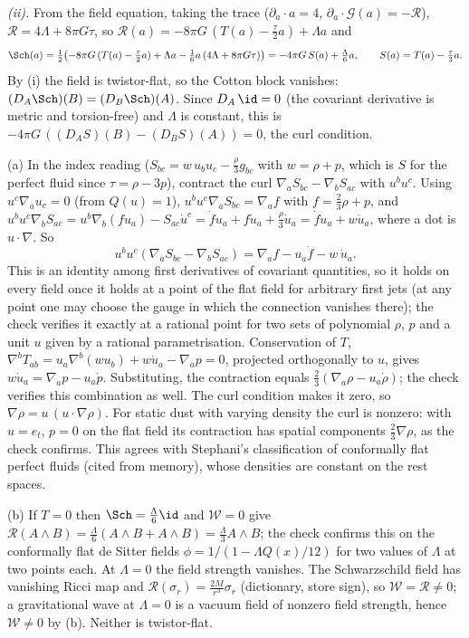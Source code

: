 \emph{(ii).} From the field equation, taking the trace ($\partial_{a} \cdot a = 4$, $\partial_{a} \cdot \mathcal{G}(a) = -\mathcal{R}$), $\mathcal{R} = 4\Lambda + 8\pi G\tau$, so $\mathcal{R}(a) = -8\pi G\,(T(a) - \tfrac{\tau}{2}a) + \Lambda a$ and
\[
\Sch(a) = \tfrac12\bigl(-8\pi G\,(T(a) - \tfrac{\tau}{2}a) + \Lambda a - \tfrac16 a\,(4\Lambda + 8\pi G\tau)\bigr) = -4\pi G\,S(a) + \tfrac{\Lambda}{6}a, \qquad S(a) = T(a) - \tfrac{\tau}{3}a .
\]
By (i) the field is twistor-flat, so the Cotton block vanishes: $(D_{A}\Sch)(B) = (D_{B}\Sch)(A)$. Since $D_{A}\,\id = 0$ (the covariant derivative is metric and torsion-free) and $\Lambda$ is constant, this is $-4\pi G\,((D_{A}S)(B) - (D_{B}S)(A)) = 0$, the curl condition.

(a) In the index reading ($S_{bc} = w\,u_{b}u_{c} - \tfrac{\rho}{3}g_{bc}$ with $w = \rho + p$, which is $S$ for the perfect fluid since $\tau = \rho - 3p$), contract the curl $\nabla_{a}S_{bc} - \nabla_{b}S_{ac}$ with $u^{b}u^{c}$. Using $u^{c}\nabla_{a}u_{c} = 0$ (from $Q(u) = 1$), $u^{b}u^{c}\nabla_{a}S_{bc} = \nabla_{a}f$ with $f = \tfrac23\rho + p$, and $u^{b}u^{c}\nabla_{b}S_{ac} = u^{b}\nabla_{b}(f u_{a}) - S_{ac}\dot u^{c} = \dot f u_{a} + f\dot u_{a} + \tfrac{\rho}{3}\dot u_{a} = \dot f u_{a} + w\dot u_{a}$, where a dot is $u \cdot \nabla$. So
\[
u^{b}u^{c}(\nabla_{a}S_{bc} - \nabla_{b}S_{ac}) = \nabla_{a}f - u_{a}\dot f - w\,\dot u_{a} .
\]
This is an identity among first derivatives of covariant quantities, so it holds on every field once it holds at a point of the flat field for arbitrary first jets (at any point one may choose the gauge in which the connection vanishes there); the check verifies it exactly at a rational point for two sets of polynomial $\rho$, $p$ and a unit $u$ given by a rational parametrisation. Conservation of $T$, $\nabla^{b}T_{ab} = u_{a}\nabla^{b}(w u_{b}) + w\dot u_{a} - \nabla_{a}p = 0$, projected orthogonally to $u$, gives $w\dot u_{a} = \nabla_{a}p - u_{a}\dot p$. Substituting, the contraction equals $\tfrac23(\nabla_{a}\rho - u_{a}\dot\rho)$; the check verifies this combination as well. The curl condition makes it zero, so $\nabla\rho = u\,(u \cdot \nabla\rho)$. For static dust with varying density the curl is nonzero: with $u = e_{t}$, $p = 0$ on the flat field its contraction has spatial components $\tfrac23\nabla\rho$, as the check confirms. This agrees with Stephani's classification of conformally flat perfect fluids (cited from memory), whose densities are constant on the rest spaces.

(b) If $T = 0$ then $\Sch = \tfrac{\Lambda}{6}\id$ and $\mathcal{W} = 0$ give $\mathcal{R}(A \wedge B) = \tfrac{\Lambda}{6}(A \wedge B + A \wedge B) = \tfrac{\Lambda}{3}A \wedge B$; the check confirms this on the conformally flat de Sitter fields $\phi = 1/(1 - \Lambda Q(x)/12)$ for two values of $\Lambda$ at two points each. At $\Lambda = 0$ the field strength vanishes. The Schwarzschild field has vanishing Ricci map and $\mathcal{R}(\sigma_{r}) = \tfrac{2M}{r^{3}}\sigma_{r}$ (dictionary, store sign), so $\mathcal{W} = \mathcal{R} \neq 0$; a gravitational wave at $\Lambda = 0$ is a vacuum field of nonzero field strength, hence $\mathcal{W} \neq 0$ by (b). Neither is twistor-flat.

